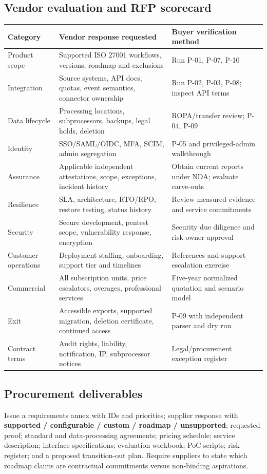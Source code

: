 \documentclass[10pt,letterpaper]{article}
\begin{document}
\subsection{Vendor evaluation and RFP scorecard}
\small

\begin{longtable}{@{}L{1.45in}L{2.38in}L{2.50in}@{}}
\toprule
\textbf{Category} & \textbf{Vendor response requested} & \textbf{Buyer verification method}\\\midrule\endhead
Product scope & Supported ISO 27001 workflows, versions, roadmap and exclusions & Run P-01, P-07, P-10\\
Integration & Source systems, API docs, quotas, event semantics, connector ownership & Run P-02, P-03, P-08; inspect API terms\\
Data lifecycle & Processing locations, subprocessors, backups, legal holds, deletion & ROPA/transfer review; P-04, P-09\\
Identity & SSO/SAML/OIDC, MFA, SCIM, admin segregation & P-05 and privileged-admin walkthrough\\
Assurance & Applicable independent attestations, scope, exceptions, incident history & Obtain current reports under NDA; evaluate carve-outs\\
Resilience & SLA, architecture, RTO/RPO, restore testing, status history & Review measured evidence and service commitments\\
Security & Secure development, pentest scope, vulnerability response, encryption & Security due diligence and risk-owner approval\\
Customer operations & Deployment staffing, onboarding, support tier and timelines & References and support escalation exercise\\
Commercial & All subscription units, price escalators, overages, professional services & Five-year normalized quotation and scenario model\\
Exit & Accessible exports, supported migration, deletion certificate, continued access & P-09 with independent parser and dry run\\
Contract terms & Audit rights, liability, notification, IP, subprocessor notices & Legal/procurement exception register\\
\bottomrule
\end{longtable}
\normalsize
\subsection{Procurement deliverables}
Issue a requirements annex with IDs and priorities; supplier response with \textbf{supported / configurable / custom / roadmap / unsupported}; requested proof; standard and data-processing agreements; pricing schedule; service description; interface specifications; evaluation workbook; PoC scripts; risk register; and a proposed transition-out plan. Require suppliers to state which roadmap claims are contractual commitments versus non-binding aspirations.
\end{document}
